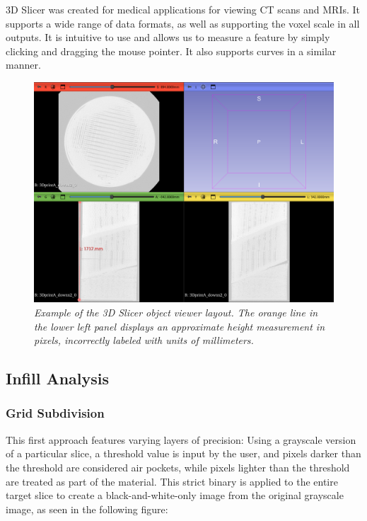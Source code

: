 \documentclass[11pt, letterpaper]{article}
\begin{document}
    3D Slicer was created for medical applications for viewing CT scans and MRIs. It supports a wide range of data formats, as well as supporting the voxel scale in all outputs. It is intuitive to use and allows us to measure a feature by simply clicking and dragging the mouse pointer. It also supports curves in a similar manner.

    \begin{figure}[H]
        \centering
        \includegraphics[width=\textwidth]{3D_Slicer_Example_Image.png}
        \caption{\emph{Example of the 3D Slicer object viewer layout. The orange line in the lower left panel displays an approximate height measurement in pixels, incorrectly labeled with units of millimeters.}}
        \label{fig:3DSlicerEx}
    \end{figure}

\subsection{Infill Analysis}
    \subsubsection{Grid Subdivision}
    This first approach features varying layers of precision: Using a grayscale version of a particular slice, a threshold value is input by the user, and pixels darker than the threshold are considered air pockets, while pixels lighter than the threshold are treated as part of the material.  This strict binary is applied to the entire target slice to create a black-and-white-only image from the original grayscale image, as seen in the following figure:
\end{document}
